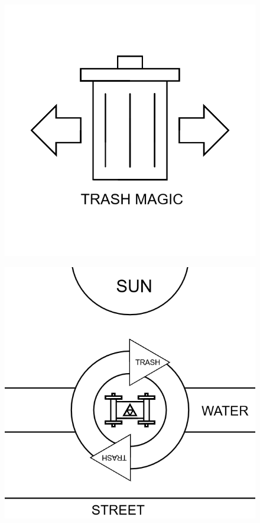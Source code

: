 \documentclass[17pt]{extreport}
\begin{document}
	\begin{figure}
		\centering
		\includegraphics[width=6.25in]{imageserver/uploadimages/image13.png}
	\end{figure}
	\begin{figure}
		\centering
		\includegraphics[width=6.25in]{imageserver/uploadimages/image14.png}
	\end{figure}
\end{document}
